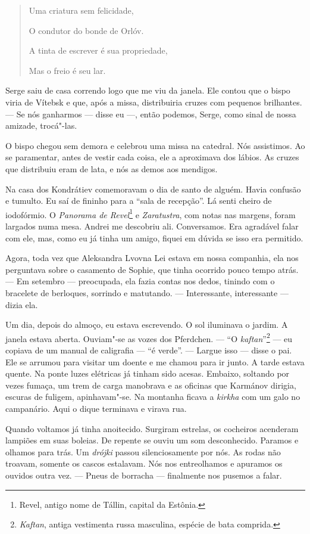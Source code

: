 \begin{verse}
Uma criatura sem felicidade,

O condutor do bonde de Orlóv.

A tinta de escrever é sua propriedade,

Mas o freio é seu lar.
\end{verse}

Serge saiu de casa correndo logo que me viu da janela. Ele contou que o
bispo viria de Vítebsk e que, após a missa, distribuiria cruzes com
pequenos brilhantes. --- Se nós ganharmos --- disse eu ---, então
podemos, Serge, como sinal de nossa amizade, trocá"-las.

O bispo chegou sem demora e celebrou uma missa na catedral. Nós
assistimos. Ao se paramentar, antes de vestir cada coisa, ele a
aproximava dos lábios. As cruzes que distribuiu eram de lata, e nós as
demos aos mendigos.

Na casa dos Kondrátiev comemoravam o dia de santo de alguém. Havia
confusão e tumulto. Eu saí de fininho para a ``sala de recepção''. Lá
senti cheiro de iodofórmio. O \emph{Panorama de Revel}\footnote{Revel,
  antigo nome de Tállin, capital da Estônia.} e \emph{Zaratustra}, com
notas nas margens, foram largados numa mesa. Andrei me descobriu ali.
Conversamos. Era agradável falar com ele, mas, como eu já tinha um
amigo, fiquei em dúvida se isso era permitido.

Agora, toda vez que Aleksandra Lvovna Lei estava em nossa companhia, ela
nos perguntava sobre o casamento de Sophie, que tinha ocorrido pouco
tempo atrás. --- Em setembro --- preocupada, ela fazia contas nos dedos,
tinindo com o bracelete de berloques, sorrindo e matutando. ---
Interessante, interessante --- dizia ela.

Um dia, depois do almoço, eu estava escrevendo. O sol iluminava o
jardim. A janela estava aberta. Ouviam"-se as vozes dos Pferdchen. ---
``O \emph{kaftan}''\footnote{\emph{Kaftan}, antiga vestimenta russa
  masculina, espécie de bata comprida.} --- eu copiava de um manual de
caligrafia --- ``é verde''. --- Largue isso --- disse o pai. Ele se
arrumou para visitar um doente e me chamou para ir junto. A tarde estava
quente. Na ponte luzes elétricas já tinham sido acesas. Embaixo,
soltando por vezes fumaça, um trem de carga manobrava e as oficinas que
Karmánov dirigia, escuras de fuligem, apinhavam"-se. Na montanha ficava a
\emph{kirkha} com um galo no campanário. Aqui o dique terminava e virava
rua.

Quando voltamos já tinha anoitecido. Surgiram estrelas, os cocheiros
acenderam lampiões em suas boleias. De repente se ouviu um som
desconhecido. Paramos e olhamos para trás. Um \emph{drójki} passou
silenciosamente por nós. As rodas não troavam, somente os cascos
estalavam. Nós nos entreolhamos e apuramos os ouvidos outra vez. ---
Pneus de borracha --- finalmente nos pusemos a falar.

